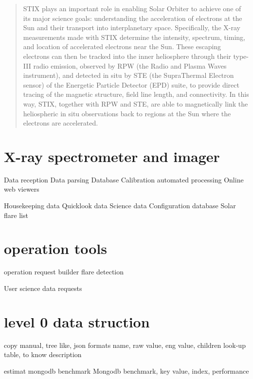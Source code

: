 \documentclass[a4paper,10pt]{article}
\begin{document}
\begin{abstract}
 
 STIX plays an important role in enabling Solar Orbiter to achieve one of its major science
goals: understanding the acceleration of electrons at the Sun and their transport into
interplanetary space. Specifically, the X-ray measurements made with STIX determine the
intensity, spectrum, timing, and location of accelerated electrons near the Sun. These
escaping electrons can then be tracked into the inner heliosphere through their type-III radio
emission, observed by RPW (the Radio and Plasma Waves instrument), and detected in situ
by STE (the SupraThermal Electron sensor) of the Energetic Particle Detector (EPD) suite,
to provide direct tracing of the magnetic structure, field line length, and connectivity. In this
way, STIX, together with RPW and STE, are able to magnetically link the heliospheric in situ
observations back to regions at the Sun where the electrons are accelerated.
\end{abstract}

\section{X-ray spectrometer and imager}

Data reception
Data parsing 
Database
Calibration automated processing
Online web viewers

Housekeeping data 
Quicklook data
Science data
Configuration database
Solar flare list
\section{operation tools}
operation request builder
flare detection


User science data requests
\section{level 0 data struction}
copy manual,
tree like, 
json formats
name, raw value, eng value, children
look-up table, to know description

estimat mongodb benchmark
Mongodb benchmark,
key value, index, performance
\end{document}
